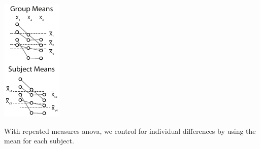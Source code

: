 \documentclass{tufte-handout}
\begin{document}
\begin{marginfigure}[50pt]
  \includegraphics[width=\linewidth]{handout5_repeated}%
  \label{fig:fullfig}%
  \caption{With repeated measures anova, we control for individual differences by using the mean for each subject.}
\end{marginfigure}
\end{document}
